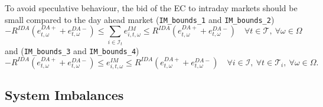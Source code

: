 \documentclass{article}
\begin{document}
To avoid speculative behaviour, the bid of the EC to intraday markets should be small compared to the day ahead market (\verb|IM_bounds_1| and \verb|IM_bounds_2|)
\begin{equation} \label{EQ:DM_IM_1}
	-R^{IDA} (e^{DA+}_{t, \omega} + e^{DA-}_{t, \omega})  \leq \sum_{i \in \mathcal{I}_t} e^{IM}_{i, t, \omega} \leq R^{IDA} (e^{DA+}_{t, \omega} + e^{DA-}_{t, \omega}) \quad \forall t \in \mathcal{T}, \ \forall \omega \in \Omega
\end{equation}
and (\verb|IM_bounds_3| and \verb|IM_bounds_4|)
\begin{equation} \label{EQ:IM_bounds_3-4}
	-R^{IDA} (e^{DA+}_{t, \omega} + e^{DA-}_{t, \omega}) \leq e^{IM}_{i, t, \omega} \leq R^{IDA} (e^{DA+}_{t, \omega} + e^{DA-}_{t, \omega}) \quad \forall i \in \mathcal{I}, \ \forall t \in \mathcal{T}_i, \ \forall \omega \in \Omega.
\end{equation}


\subsection{System Imbalances}
\end{document}
